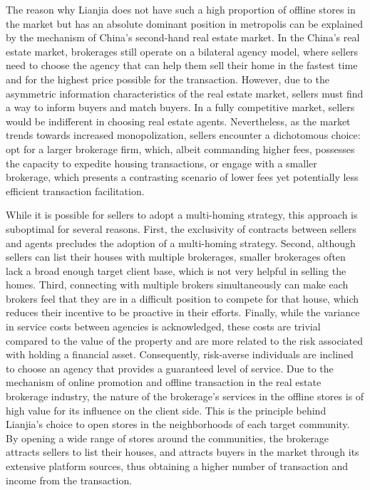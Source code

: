 \documentclass[12pt]{article}
\begin{document}
The reason why Lianjia does not have such a high proportion of offline stores in the market but has an absolute dominant position in metropolis can be explained by the mechanism of China's second-hand real estate market. In the China's real estate market, brokerages still operate on a bilateral agency model, where sellers need to choose the agency that can help them sell their home in the fastest time and for the highest price possible for the transaction. However, due to the asymmetric information characteristics of the real estate market, sellers must find a way to inform buyers and match buyers. In a fully competitive market, sellers would be indifferent in choosing real estate agents. Nevertheless, as the market trends towards increased monopolization, sellers encounter a dichotomous choice: opt for a larger brokerage firm, which, albeit commanding higher fees, possesses the capacity to expedite housing transactions, or engage with a smaller brokerage, which presents a contrasting scenario of lower fees yet potentially less efficient transaction facilitation.

While it is possible for sellers to adopt a multi-homing strategy, this approach is suboptimal for several reasons. First, the exclusivity of contracts between sellers and agents precludes the adoption of a multi-homing strategy. Second, although sellers can list their houses with multiple brokerages, smaller brokerages often lack a broad enough target client base, which is not very helpful in selling the homes. Third, connecting with multiple brokers simultaneously can make each brokers feel that they are in a difficult position to compete for that house, which reduces their incentive to be proactive in their efforts. Finally, while the variance in service costs between agencies is acknowledged, these costs are trivial compared to the value of the property and are more related to the risk associated with holding a financial asset. Consequently, risk-averse individuals are inclined to choose an agency that provides a guaranteed level of service. Due to the mechanism of online promotion and offline transaction in the real estate brokerage industry, the nature of the brokerage's services in the offline stores is of high value for its influence on the client side. This is the principle behind Lianjia's choice to open stores in the neighborhoods of each target community. By opening a wide range of stores around the communities, the brokerage attracts sellers to list their houses, and attracts buyers in the market through its extensive platform sources, thus obtaining a higher number of transaction and income from the transaction.
\end{document}

